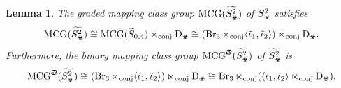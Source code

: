 \documentclass[11pt,a4paper,reqno]{amsart}%
\theoremstyle{plain}
\newtheorem{lemma}[lemma]{Lemma}
\theoremstyle{definition}
\numberwithin{equation}{section}
\numberwithin{equation}{section}
\def\ZZ{\mathbb{Z}}
\def\x{_\vot}
\newcommand{\MCG}{\operatorname{MCG}}
\def\Br{\operatorname{Br}}
\def\vot{\text{\Biohazard}}
\def\sx{\text{\Cancer}}
\begin{document}
 \begin{lemma}\label{2mcg} The graded   mapping class group $\MCG(\widetilde{S\x^2})$
 of $S\x^2$  satisfies
\begin{equation}
    \label{mcg2,2,2,2}
\MCG(\widetilde{S\x^2})\cong\MCG(\widetilde{S}_{0,4})\ltimes_{\rm conj}  \mathrm{D}_{\vot}\cong(\Br_3\ltimes_{\rm conj}\langle\tilde\iota_1,\tilde\iota_2\rangle)\ltimes_{\rm conj} \mathrm{D}_{\vot}.
\end{equation}
Furthermore, the binary   mapping class group $\MCG^\sx(\widetilde{S\x^2} )$ of $\widetilde{S\x^2} $  is
\begin{equation}
    \label{mcgg2222} \MCG^\sx(\widetilde{S\x^2} )\cong 
    (\Br_3\ltimes_{\rm conj}\langle\tilde\iota_1,\tilde\iota_2\rangle)\ltimes_{\rm conj}\overline{\mathrm{D}}_{\vot}\cong \Br_3\ltimes_{\rm conj}(\langle\tilde\iota_1,\tilde\iota_2\rangle \ltimes_{\rm conj}\overline{\mathrm{D}}_{\vot}).  
\end{equation}
 \end{lemma}
\end{document}
